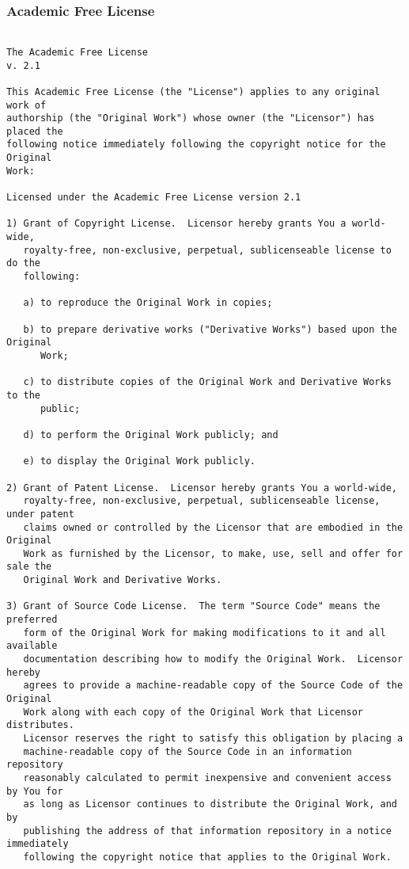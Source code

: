 \newpage

\subsubsection{Academic Free License}

\begin{verbatim}

The Academic Free License
v. 2.1

This Academic Free License (the "License") applies to any original work of
authorship (the "Original Work") whose owner (the "Licensor") has placed the
following notice immediately following the copyright notice for the Original
Work:

Licensed under the Academic Free License version 2.1

1) Grant of Copyright License.  Licensor hereby grants You a world-wide,
   royalty-free, non-exclusive, perpetual, sublicenseable license to do the
   following:

   a) to reproduce the Original Work in copies;

   b) to prepare derivative works ("Derivative Works") based upon the Original
      Work;

   c) to distribute copies of the Original Work and Derivative Works to the 
      public;

   d) to perform the Original Work publicly; and

   e) to display the Original Work publicly.

2) Grant of Patent License.  Licensor hereby grants You a world-wide,
   royalty-free, non-exclusive, perpetual, sublicenseable license, under patent
   claims owned or controlled by the Licensor that are embodied in the Original
   Work as furnished by the Licensor, to make, use, sell and offer for sale the
   Original Work and Derivative Works.

3) Grant of Source Code License.  The term "Source Code" means the preferred
   form of the Original Work for making modifications to it and all available
   documentation describing how to modify the Original Work.  Licensor hereby
   agrees to provide a machine-readable copy of the Source Code of the Original
   Work along with each copy of the Original Work that Licensor distributes.
   Licensor reserves the right to satisfy this obligation by placing a
   machine-readable copy of the Source Code in an information repository 
   reasonably calculated to permit inexpensive and convenient access by You for
   as long as Licensor continues to distribute the Original Work, and by
   publishing the address of that information repository in a notice immediately
   following the copyright notice that applies to the Original Work.


\end{verbatim}
